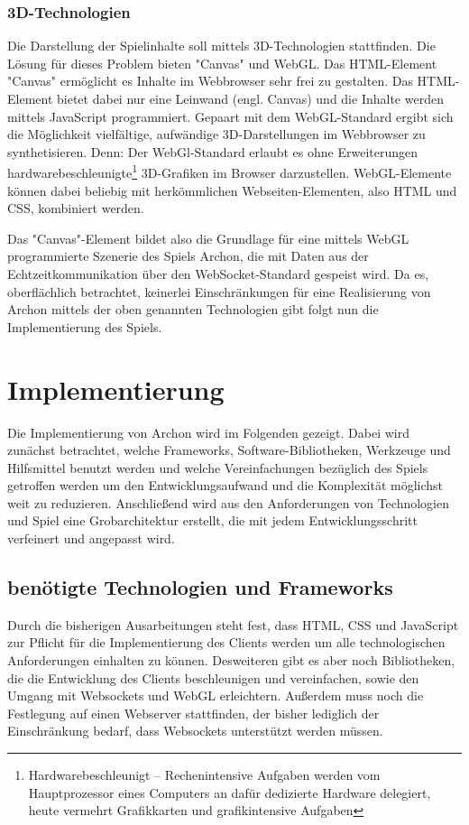 \subsubsection{3D-Technologien}
Die Darstellung der Spielinhalte soll mittels 3D-Technologien stattfinden. Die Lösung für dieses Problem bieten "Canvas" und WebGL. Das HTML-Element "Canvas" ermöglicht es Inhalte im Webbrowser sehr frei zu gestalten. Das HTML-Element bietet dabei nur eine Leinwand (engl. Canvas) und die Inhalte werden mittels JavaScript programmiert. Gepaart mit dem WebGL-Standard ergibt sich die Möglichkeit vielfältige, aufwändige 3D-Darstellungen im Webbrowser zu synthetisieren. Denn:  Der WebGl-Standard erlaubt es ohne Erweiterungen hardwarebeschleunigte\footnote{Hardwarebeschleunigt -- Rechenintensive Aufgaben werden vom Hauptprozessor eines Computers an dafür dedizierte Hardware delegiert, heute vermehrt Grafikkarten und grafikintensive Aufgaben} 3D-Grafiken im Browser darzustellen. WebGL-Elemente können dabei beliebig mit herkömmlichen Webseiten-Elementen, also HTML und CSS, kombiniert werden.

Das "Canvas"-Element bildet also die Grundlage für eine mittels WebGL programmierte Szenerie des Spiels Archon, die mit Daten aus der Echtzeitkommunikation über den WebSocket-Standard gespeist wird. Da es, oberflächlich betrachtet, keinerlei Einschränkungen für eine Realisierung von Archon mittels der oben genannten Technologien gibt folgt nun die Implementierung des Spiels.
\section{Implementierung}
\label{sec:Umsetzung}
Die Implementierung von Archon wird im Folgenden gezeigt. Dabei wird zunächst betrachtet, welche Frameworks, Software-Bibliotheken, Werkzeuge und Hilfsmittel benutzt werden und welche Vereinfachungen bezüglich des Spiels getroffen werden um den Entwicklungsaufwand und die Komplexität möglichst weit zu reduzieren. Anschließend wird aus den Anforderungen von Technologien und Spiel eine Grobarchitektur erstellt, die mit jedem Entwicklungsschritt verfeinert und \ggf angepasst wird.

\subsection{benötigte Technologien und Frameworks}
\label{subsec:Technologien}
Durch die bisherigen Ausarbeitungen steht fest, dass HTML, CSS und JavaScript zur Pflicht für die Implementierung des Clients werden um alle technologischen Anforderungen einhalten zu können. Desweiteren gibt es aber noch Bibliotheken, die die Entwicklung des Clients beschleunigen und vereinfachen, sowie den Umgang mit Websockets und WebGL erleichtern. Außerdem muss noch die Festlegung auf einen Webserver stattfinden, der bisher lediglich der Einschränkung bedarf, dass Websockets unterstützt werden müssen.

